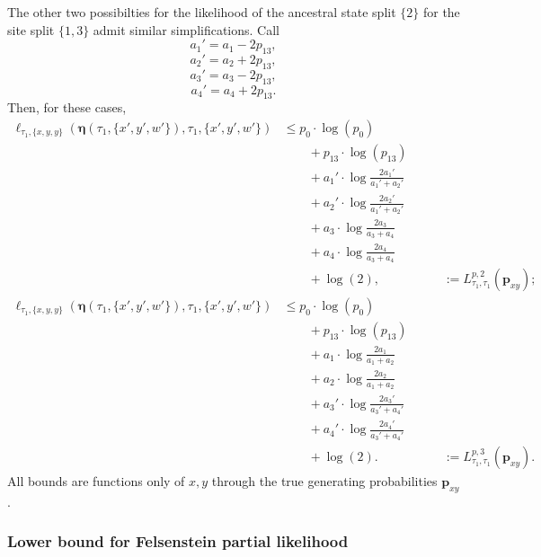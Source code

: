 \documentclass[a4paper]{article}
\newcommand{\fullAncestralSplitPartitions}{\boldsymbol\eta}
\begin{document}
The other two possibilties for the likelihood of the ancestral state split $\{2\}$ for the site split $\{1,3\}$ admit similar simplifications.
Call
$$
a_{1}' = a_{1}-2p_{13},
$$
$$
a_{2}' = a_{2}+2p_{13},
$$
$$
a_{3}' = a_{3}-2p_{13},
$$
$$
a_{4}' = a_{4}+2p_{13}.
$$
Then, for these cases,
\begin{align*}
    \ell_{\tau_1,\{x,y,y\}}(\fullAncestralSplitPartitions(\tau_1,\{x',y',w'\}),\tau_1,\{x',y',w'\})
    &\le      p_{0}  \cdot\log(p_{0}) \\
    &\qquad + p_{13} \cdot\log(p_{13}) \\
    &\qquad + a_{1}'\cdot\log\frac{2a_{1}'}{a_{1}'+a_{2}'} \\
    &\qquad + a_{2}'\cdot\log\frac{2a_{2}'}{a_{1}'+a_{2}'} \\
    &\qquad + a_{3}\cdot\log\frac{2a_{3}}{a_{3}+a_{4}} \\
    &\qquad + a_{4}\cdot\log\frac{2a_{4}}{a_{3}+a_{4}} \\
    &\qquad + \log(2),
    &\qquad := L^{p,2}_{\tau_1,\tau_1}(\mathbf{p}_{xy});
\end{align*}
\begin{align*}
    \ell_{\tau_1,\{x,y,y\}}(\fullAncestralSplitPartitions(\tau_1,\{x',y',w'\}),\tau_1,\{x',y',w'\})
    &\le      p_{0}  \cdot\log(p_{0}) \\
    &\qquad + p_{13} \cdot\log(p_{13}) \\
    &\qquad + a_{1}\cdot\log\frac{2a_{1}}{a_{1}+a_{2}} \\
    &\qquad + a_{2}\cdot\log\frac{2a_{2}}{a_{1}+a_{2}} \\
    &\qquad + a_{3}'\cdot\log\frac{2a_{3}'}{a_{3}'+a_{4}'} \\
    &\qquad + a_{4}'\cdot\log\frac{2a_{4}'}{a_{3}'+a_{4}'} \\
    &\qquad + \log(2).
    &\qquad := L^{p,3}_{\tau_1,\tau_1}(\mathbf{p}_{xy}).
\end{align*}
All bounds are functions only of $x,y$ through the true generating probabilities $\mathbf{p}_{xy}$.

\subsubsection{Lower bound for Felsenstein partial likelihood}
\end{document}
